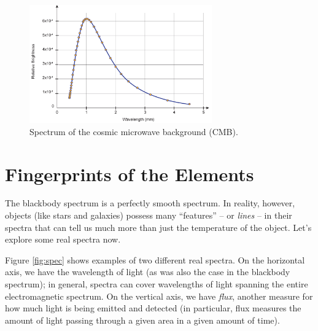 \documentclass[11pt]{article}
\begin{document}
\begin{figure}[h!]
    \centering
    \includegraphics[width=0.7\textwidth]{Images/CMB.jpg}
    \caption{Spectrum of the cosmic microwave background (CMB).}
    \label{fig:CMB}
\end{figure}


\section{Fingerprints of the Elements}

The blackbody spectrum is a perfectly smooth spectrum. In reality, however, objects (like stars and galaxies) possess many ``features'' -- or \emph{lines} -- in their spectra that can tell us much more than just the temperature of the object. Let's explore some real spectra now.

Figure \ref{fig:spec} shows examples of two different real spectra. On the horizontal axis, we have the wavelength of light (as was also the case in the blackbody spectrum); in general, spectra can cover wavelengths of light spanning the entire electromagnetic spectrum. On the vertical axis, we have \textit{flux}, another measure for how much light is being emitted and detected (in particular, flux measures the amount of light passing through a given area in a given amount of time).

\bigskip
\end{document}
